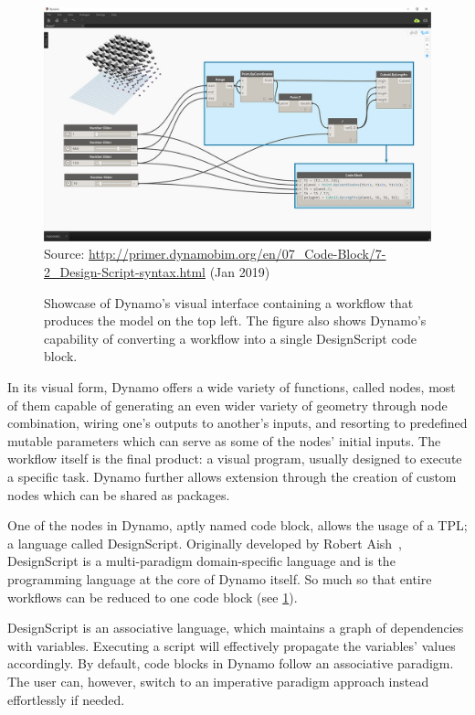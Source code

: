 \begin{figure}[htb]
  \includegraphics[width=\textwidth]{fig/dynamo-node-to-code}\\
  {\scriptsize
  Source: \url{http://primer.dynamobim.org/en/07_Code-Block/7-2_Design-Script-syntax.html}
  (Jan 2019)
  }
  \caption[Dynamo's visual interface with node to code translation]{
    Showcase of Dynamo's visual interface containing a workflow that produces
    the model on the top left.  The figure also shows Dynamo's capability of
    converting a workflow into a single DesignScript code block.}%
  \label{fig:related.ad.dynamo.node2code}
\end{figure}

In its visual form, Dynamo offers a wide variety of functions, called nodes,
most of them capable of generating an even wider variety of geometry through
node combination, wiring one's outputs to another's inputs, and resorting to
predefined mutable parameters which can serve as some of the nodes' initial
inputs.  The workflow itself is the final product: a visual program, usually
designed to execute a specific task.  Dynamo further allows extension through the
creation of custom nodes which can be shared as packages.

One of the nodes in Dynamo, aptly named code block, allows the usage of a
\ac{TPL}; a language called DesignScript.  Originally developed by Robert
Aish~\cite{Aish:2011:DesignScript}, DesignScript is a multi-paradigm
domain-specific language and is the programming language at the core of Dynamo
itself.  So much so that entire workflows can be reduced to one code block (see
\cref{fig:related.ad.dynamo.node2code}).

DesignScript is an associative language, which maintains a graph of dependencies
with variables.  Executing a script will effectively propagate the variables'
values accordingly.  By default, code blocks in Dynamo follow an associative
paradigm.  The user can, however, switch to an imperative paradigm approach
instead effortlessly if needed.

